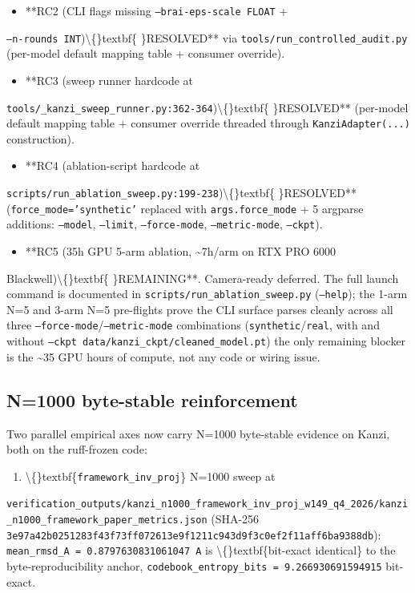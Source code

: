 \documentclass[preprint,3p,times,twocolumn]{elsarticle}
\begin{document}
\begin{itemize}
\item **RC2 (CLI flags missing  \texttt{--brai-eps-scale FLOAT} +
\end{itemize}
\texttt{--n-rounds INT})\textbackslash\{\}textbf\{  \}RESOLVED** via \texttt{tools/run\_controlled\_audit.py} (per-model default mapping table + consumer override).

\begin{itemize}
\item **RC3 (sweep runner hardcode at
\end{itemize}
\texttt{tools/\_kanzi\_sweep\_runner.py:362-364})\textbackslash\{\}textbf\{  \}RESOLVED** (per-model default mapping table + consumer override threaded through \texttt{KanziAdapter(...)} construction).

\begin{itemize}
\item **RC4 (ablation-script hardcode at
\end{itemize}
\texttt{scripts/run\_ablation\_sweep.py:199-238})\textbackslash\{\}textbf\{  \}RESOLVED** (\texttt{force\_mode='synthetic'} replaced with \texttt{args.force\_mode} + 5 argparse additions: \texttt{--model}, \texttt{--limit}, \texttt{--force-mode}, \texttt{--metric-mode}, \texttt{--ckpt}).

\begin{itemize}
\item **RC5 (35h GPU 5-arm ablation, \textasciitilde{}7h/arm on RTX PRO 6000
\end{itemize}
Blackwell)\textbackslash\{\}textbf\{  \}REMAINING**. Camera-ready deferred. The full launch command is documented in \texttt{scripts/run\_ablation\_sweep.py} (\texttt{--help}); the 1-arm N=5 and 3-arm N=5 pre-flights prove the CLI surface parses cleanly across all three \texttt{--force-mode}/\texttt{--metric-mode} combinations (\texttt{synthetic}/\texttt{real}, with and without \texttt{--ckpt data/kanzi\_ckpt/cleaned\_model.pt})  the only remaining blocker is the \textasciitilde{}35 GPU hours of compute, not any code or wiring issue.

\subsection{N=1000 byte-stable reinforcement}
Two parallel empirical axes now carry N=1000 byte-stable evidence on Kanzi, both on the ruff-frozen code:

\begin{enumerate}
\item \textbackslash\{\}textbf\{\texttt{framework\_inv\_proj}\}  N=1000 sweep at
\end{enumerate}
\texttt{verification\_outputs/kanzi\_n1000\_framework\_inv\_proj\_w149\_q4\_2026/kanzi\_n1000\_framework\_paper\_metrics.json} (SHA-256 \texttt{3e97a42b0251283f43f73ff072613e9f1211c943d9f3c0ef2f11aff6ba9388db}): \texttt{mean\_rmsd\_A = 0.8797630831061047 A} is \textbackslash\{\}textbf\{bit-exact identical\} to the byte-reproducibility anchor, \texttt{codebook\_entropy\_bits = 9.266930691594915} bit-exact.
\end{document}
